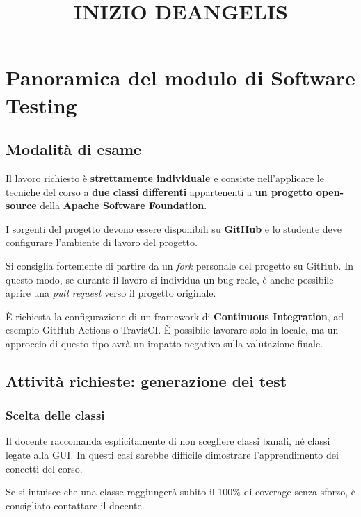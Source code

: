 \title{INIZIO DEANGELIS}
\newpage

\chapter{Panoramica del modulo di Software Testing}

\section{Modalità di esame}

Il lavoro richiesto è \textbf{strettamente individuale} e consiste nell'applicare le tecniche del corso a \textbf{due classi differenti} appartenenti a \textbf{un progetto open-source} della \textbf{Apache Software Foundation}.

I sorgenti del progetto devono essere disponibili su \textbf{GitHub} e lo studente deve configurare l'ambiente di lavoro del progetto.

\begin{notaprof}
Si consiglia fortemente di partire da un \emph{fork} personale del progetto su GitHub. In questo modo, se durante il lavoro si individua un bug reale, è anche possibile aprire una \emph{pull request} verso il progetto originale.
\end{notaprof}

\begin{notaesame}
È richiesta la configurazione di un framework di \textbf{Continuous Integration}, ad esempio GitHub Actions o TravisCI. È possibile lavorare solo in locale, ma un approccio di questo tipo avrà un impatto negativo sulla valutazione finale.
\end{notaesame}

\section{Attività richieste: generazione dei test}

\subsection{Scelta delle classi}

\begin{notaesame}
Il docente raccomanda esplicitamente di non scegliere classi banali, né classi legate alla GUI. In questi casi sarebbe difficile dimostrare l'apprendimento dei concetti del corso.
\end{notaesame}

\begin{notaslide}
Se si intuisce che una classe raggiungerà subito il 100\% di coverage senza sforzo, è consigliato contattare il docente.
\end{notaslide}

